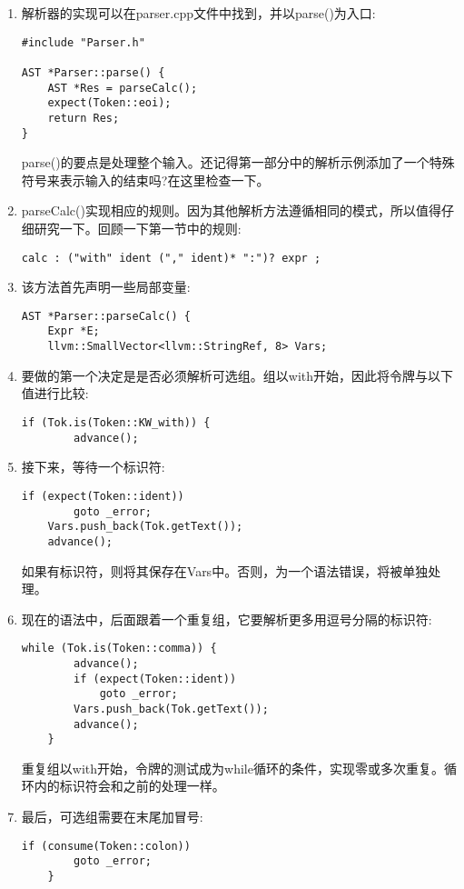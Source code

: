 \begin{enumerate}
\item 解析器的实现可以在parser.cpp文件中找到，并以parse()为入口:
\begin{lstlisting}[caption={}]
#include "Parser.h"

AST *Parser::parse() {
	AST *Res = parseCalc();
	expect(Token::eoi);
	return Res;
}
\end{lstlisting}
parse()的要点是处理整个输入。还记得第一部分中的解析示例添加了一个特殊符号来表示输入的结束吗?在这里检查一下。

\item parseCalc()实现相应的规则。因为其他解析方法遵循相同的模式，所以值得仔细研究一下。回顾一下第一节中的规则:
\begin{lstlisting}[caption={}]
calc : ("with" ident ("," ident)* ":")? expr ;
\end{lstlisting}

\item 该方法首先声明一些局部变量:
\begin{lstlisting}[caption={}]
AST *Parser::parseCalc() {
	Expr *E;
	llvm::SmallVector<llvm::StringRef, 8> Vars;
\end{lstlisting}

\item 要做的第一个决定是是否必须解析可选组。组以with开始，因此将令牌与以下值进行比较:
\begin{lstlisting}[caption={}]
	if (Tok.is(Token::KW_with)) {
		advance();
\end{lstlisting}

\item 接下来，等待一个标识符:
\begin{lstlisting}[caption={}]
	if (expect(Token::ident))
		goto _error;
	Vars.push_back(Tok.getText());
	advance();
\end{lstlisting}
如果有标识符，则将其保存在Vars中。否则，为一个语法错误，将被单独处理。

\item 现在的语法中，后面跟着一个重复组，它要解析更多用逗号分隔的标识符:
\begin{lstlisting}[caption={}]
	while (Tok.is(Token::comma)) {
		advance();
		if (expect(Token::ident))
			goto _error;
		Vars.push_back(Tok.getText());
		advance();
	}
\end{lstlisting}
重复组以with开始，令牌的测试成为while循环的条件，实现零或多次重复。循环内的标识符会和之前的处理一样。

\item 最后，可选组需要在末尾加冒号:
\begin{lstlisting}[caption={}]
	if (consume(Token::colon))
		goto _error;
	}
\end{lstlisting}


\end{enumerate}
